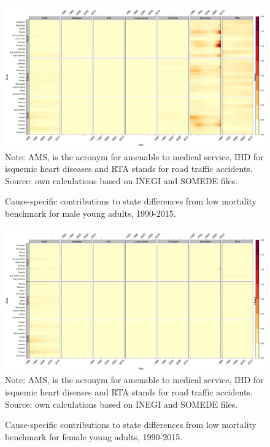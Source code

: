 \documentclass[11.5pt]{article}
\begin{document}
{\begin{figure}
\centering
\caption{Cause-specific contributions to state differences from low mortality benchmark for male young adults, 1990-2015.}
\label{fig:e15_39_males}
\includegraphics[scale=.3]{Figures/YoungAdult_Male_heatmap.pdf}
Note: AMS, is the acronym for amenable to medical service, IHD for isquemic heart diseases and RTA stands for road traffic accidents. Source: own calculations based on INEGI and SOMEDE files. 
\end{figure}

\begin{figure}
\centering
\caption{Cause-specific contributions to state differences from low mortality benchmark for female young adults, 1990-2015.}
\label{fig:e15_39_females}
\includegraphics[scale=.3]{Figures/YoungAdult_Female_heatmap.pdf}
Note: AMS, is the acronym for amenable to medical service, IHD for isquemic heart diseases and RTA stands for road traffic accidents. Source: own calculations based on INEGI and SOMEDE files. 
\end{figure}



\begin{landscape}


\end{landscape}}
\end{document}

